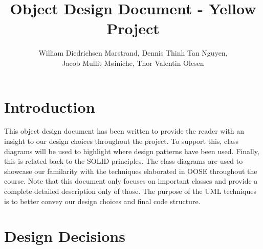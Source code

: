 \documentclass{article}
\title{Object Design Document - Yellow Project}
\author{William Diedrichsen Marstrand, Dennis Thinh Tan Nguyen, 
\\Jacob Mullit M{\o}iniche, Thor Valentin Olesen}
\begin{document}
\maketitle
\newpage
\tableofcontents
\newpage

\section{Introduction}

This object design document has been written to provide the reader with an insight to our design choices throughout the project. To support this, class diagrams will be used to highlight where design patterns have been used. Finally, this is related back to the SOLID principles. The class diagrams are used to showcase our familarity with the techniques elaborated in OOSE throughout the course. Note that this document only focuses on important classes and provide a complete detailed description only of those. The purpose of the UML techniques is to better convey our design choices and final code structure. 



\section{Design Decisions}
	
\end{document}

